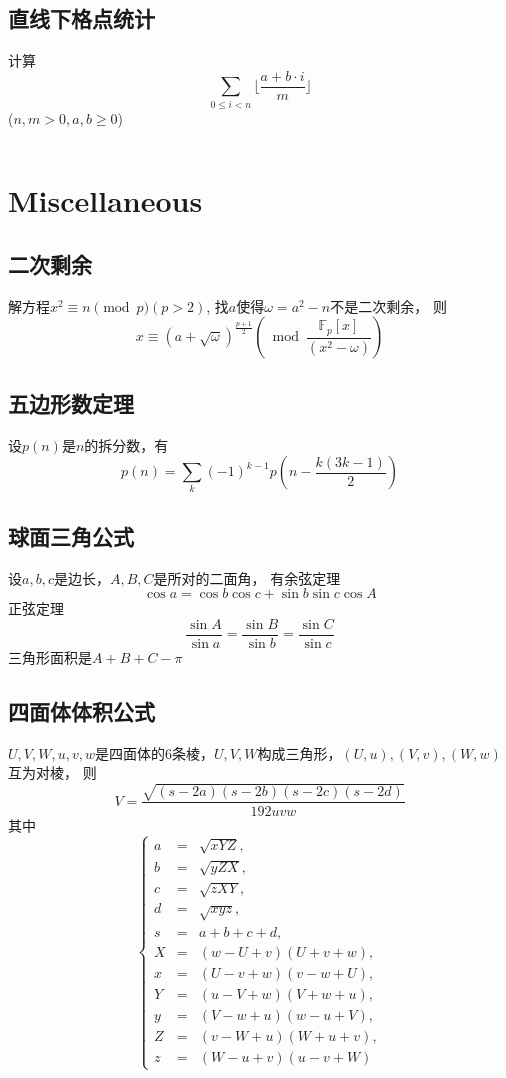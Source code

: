 \documentclass[a4paper]{article}
\newcommand{\cppcode}[1]{
    \inputminted[mathescape]{cpp}{source/#1}
}
\begin{document}
\subsection{直线下格点统计}

计算$$\sum_{0 \leq i < n} \lfloor \frac{a + b \cdot i}{m} \rfloor$$
($n, m > 0, a, b \geq 0$)
\cppcode{lattice-count.cpp}

\section{Miscellaneous}

\subsection{二次剩余}

解方程$x^2 \equiv n \pmod p (p > 2)$, 
找$a$使得$\omega = a^2 - n$不是二次剩余，
则$$x \equiv (a + \sqrt{\omega})^{\frac{p + 1}{2}} \left(\bmod \frac{\mathbb{F}_p[x]}{(x^2 - \omega)}\right)$$

\subsection{五边形数定理}

设$p(n)$是$n$的拆分数，有$$p(n) = \sum_{k} (-1)^{k - 1} p\left(n - \frac{k(3k - 1)}{2}\right)$$

\subsection{球面三角公式}

设$a, b, c$是边长，$A, B, C$是所对的二面角，
有余弦定理$$\cos a = \cos b \cos c + \sin b \sin c \cos A$$
正弦定理$$\frac{\sin A}{\sin a} = \frac{\sin B}{\sin b} = \frac{\sin C}{\sin c}$$
三角形面积是$A + B + C - \pi$


\subsection{四面体体积公式}

$U, V, W, u, v, w$是四面体的$6$条棱，$U, V, W$构成三角形，$(U, u), (V, v), (W, w)$互为对棱，
则$$V = \frac{\sqrt{(s - 2a)(s - 2b)(s - 2c)(s - 2d)}}{192 uvw}$$
其中$$\left\{\begin{array}{lll}
        a & = & \sqrt{xYZ}, \\
        b & = & \sqrt{yZX}, \\
        c & = & \sqrt{zXY}, \\
        d & = & \sqrt{xyz}, \\
        s & = & a + b + c + d, \\ 
        X & = & (w - U + v)(U + v + w), \\
        x & = & (U - v + w)(v - w + U), \\
        Y & = & (u - V + w)(V + w + u), \\
        y & = & (V - w + u)(w - u + V), \\
        Z & = & (v - W + u)(W + u + v), \\
        z & = & (W - u + v)(u - v + W)
    \end{array}\right.$$
\end{document}
